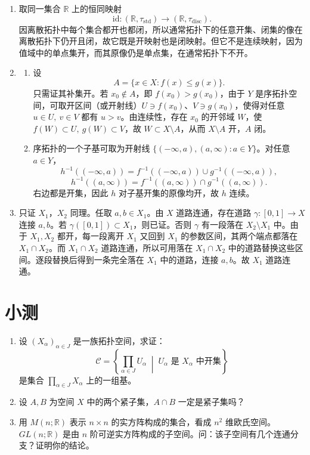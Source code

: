 \documentclass{article}
\newcommand{\R}{\mathbb{R}}
\begin{document}
\begin{enumerate}
  \item 取同一集合 $\R$ 上的恒同映射
        \[
          \mathrm{id}:(\R,\tau_{\mathrm{std}})\to(\R,\tau_{\mathrm{disc}}).
        \]
        因离散拓扑中每个集合都开也都闭，所以通常拓扑下的任意开集、闭集的像在离散拓扑下仍开且闭，故它既是开映射也是闭映射。但它不是连续映射，因为值域中的单点集开，而其原像仍是单点集，在通常拓扑下不开。

  \item
        \begin{enumerate}
          \item 设
                \[
                  A=\{x\in X:f(x)\le g(x)\}.
                \]
                只需证其补集开。若 $x_0\notin A$，即 $f(x_0)>g(x_0)$，由于 $Y$ 是序拓扑空间，可取开区间（或开射线）$U\ni f(x_0)$、$V\ni g(x_0)$，使得对任意 $u\in U,\ v\in V$ 都有 $u>v$。由连续性，存在 $x_0$ 的开邻域 $W$，使 $f(W)\subset U,\ g(W)\subset V$，故 $W\subset X\setminus A$，从而 $X\setminus A$ 开，$A$ 闭。

          \item 序拓扑的一个子基可取为开射线 $\{(-\infty,a),(a,\infty):a\in Y\}$。对任意 $a\in Y$，
                \[
                  h^{-1}((-\infty,a))
                  =f^{-1}((-\infty,a))\cup g^{-1}((-\infty,a)),
                \]
                \[
                  h^{-1}((a,\infty))
                  =f^{-1}((a,\infty))\cap g^{-1}((a,\infty)).
                \]
                右边都是开集，因此 $h$ 对子基开集的原像均开，故 $h$ 连续。
        \end{enumerate}

  \item 只证 $X_1$，$X_2$ 同理。任取 $a,b\in X_1$。由 $X$ 道路连通，存在道路 $\gamma:[0,1]\to X$ 连接 $a,b$。若 $\gamma([0,1])\subset X_1$，则已证。否则 $\gamma$ 有一段落在 $X_2\setminus X_1$ 中。由于 $X_1,X_2$ 都开，每一段离开 $X_1$ 又回到 $X_1$ 的参数区间，其两个端点都落在 $X_1\cap X_2$。而 $X_1\cap X_2$ 道路连通，所以可用落在 $X_1\cap X_2$ 中的道路替换这些区间。逐段替换后得到一条完全落在 $X_1$ 中的道路，连接 $a,b$。故 $X_1$ 道路连通。
\end{enumerate}

\section{小测}

\begin{enumerate}
  \item 设 $(X_\alpha)_{\alpha\in J}$ 是一族拓扑空间，求证：
        \[
          \mathcal C=\left\{\prod_{\alpha\in J}U_\alpha\;\middle|\;U_\alpha\text{ 是 }X_\alpha\text{ 中开集}\right\}
        \]
        是集合 $\prod_{\alpha\in J}X_\alpha$ 上的一组基。

  \item 设 $A,B$ 为空间 $X$ 中的两个紧子集，$A\cap B$ 一定是紧子集吗？

  \item 用 $M(n;\R)$ 表示 $n\times n$ 的实方阵构成的集合，看成 $n^2$ 维欧氏空间。$GL(n;\R)$ 是由 $n$ 阶可逆实方阵构成的子空间。问：该子空间有几个连通分支？证明你的结论。
\end{enumerate}
\end{document}
